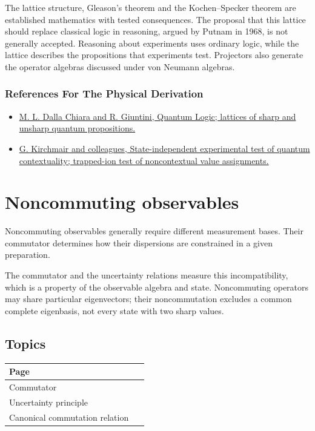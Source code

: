 \documentclass[11pt,oneside]{book}
\begin{document}
The lattice structure, Gleason's theorem and the Kochen--Specker theorem are established mathematics with tested consequences. The proposal that this lattice should replace classical logic in reasoning, argued by Putnam in 1968, is not generally accepted. Reasoning about experiments uses ordinary logic, while the lattice describes the propositions that experiments test. Projectors also generate the operator algebras discussed under von Neumann algebras.

\subsection*{References For The Physical Derivation}
\begin{itemize}
\item \href{https://arxiv.org/abs/quant-ph/0101028}{M. L. Dalla Chiara and R. Giuntini, Quantum Logic; lattices of sharp and unsharp quantum propositions.}
\item \href{https://arxiv.org/abs/0904.1655}{G. Kirchmair and colleagues, State-independent experimental test of quantum contextuality; trapped-ion test of noncontextual value assignments.}
\end{itemize}





\chapter{Noncommuting observables}

Noncommuting observables generally require different measurement bases. Their commutator determines how their dispersions are constrained in a given preparation.

The commutator and the uncertainty relations measure this incompatibility, which is a property of the observable algebra and state. Noncommuting operators may share particular eigenvectors; their noncommutation excludes a common complete eigenbasis, not every state with two sharp values.

\section*{Topics}

\begin{longtable}{p{0.92\linewidth}}
\toprule
Page \\
\midrule
\endhead
{}\label{page:commutator}Commutator \\
\label{page:uncertainty-principle}Uncertainty principle \\
\label{page:canonical-commutation-relation}Canonical commutation relation \\
\bottomrule
\end{longtable}
\end{document}

